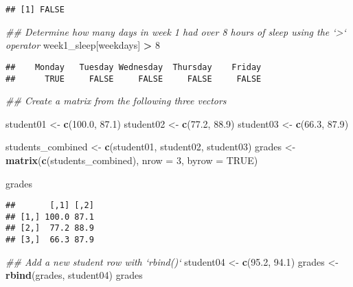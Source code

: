 \documentclass[
]{article}
\newenvironment{Shaded}{\begin{snugshade}}{\end{snugshade}}
\newcommand{\CommentTok}[1]{\textcolor[rgb]{0.56,0.35,0.01}{\textit{#1}}}
\newcommand{\DataTypeTok}[1]{\textcolor[rgb]{0.13,0.29,0.53}{#1}}
\newcommand{\DecValTok}[1]{\textcolor[rgb]{0.00,0.00,0.81}{#1}}
\newcommand{\FloatTok}[1]{\textcolor[rgb]{0.00,0.00,0.81}{#1}}
\newcommand{\KeywordTok}[1]{\textcolor[rgb]{0.13,0.29,0.53}{\textbf{#1}}}
\newcommand{\NormalTok}[1]{#1}
\newcommand{\OperatorTok}[1]{\textcolor[rgb]{0.81,0.36,0.00}{\textbf{#1}}}
\newcommand{\OtherTok}[1]{\textcolor[rgb]{0.56,0.35,0.01}{#1}}
\newcommand{\StringTok}[1]{\textcolor[rgb]{0.31,0.60,0.02}{#1}}
\begin{document}
\begin{verbatim}
## [1] FALSE
\end{verbatim}

\begin{Shaded}
\begin{Highlighting}[]
\CommentTok{## Determine how many days in week 1 had over 8 hours of sleep using the `>` operator}
\NormalTok{week1_sleep[weekdays] }\OperatorTok{>}\StringTok{ }\DecValTok{8}
\end{Highlighting}
\end{Shaded}

\begin{verbatim}
##    Monday   Tuesday Wednesday  Thursday    Friday 
##      TRUE     FALSE     FALSE     FALSE     FALSE
\end{verbatim}

\begin{Shaded}
\begin{Highlighting}[]
\CommentTok{## Create a matrix from the following three vectors}

\NormalTok{student01 <-}\StringTok{ }\KeywordTok{c}\NormalTok{(}\FloatTok{100.0}\NormalTok{, }\FloatTok{87.1}\NormalTok{)}
\NormalTok{student02 <-}\StringTok{ }\KeywordTok{c}\NormalTok{(}\FloatTok{77.2}\NormalTok{, }\FloatTok{88.9}\NormalTok{)}
\NormalTok{student03 <-}\StringTok{ }\KeywordTok{c}\NormalTok{(}\FloatTok{66.3}\NormalTok{, }\FloatTok{87.9}\NormalTok{)}

\NormalTok{students_combined <-}\StringTok{ }\KeywordTok{c}\NormalTok{(student01, student02, student03)}
\NormalTok{grades <-}\StringTok{ }\KeywordTok{matrix}\NormalTok{(}\KeywordTok{c}\NormalTok{(students_combined), }\DataTypeTok{nrow =} \DecValTok{3}\NormalTok{, }\DataTypeTok{byrow =} \OtherTok{TRUE}\NormalTok{)}

\NormalTok{grades}
\end{Highlighting}
\end{Shaded}

\begin{verbatim}
##       [,1] [,2]
## [1,] 100.0 87.1
## [2,]  77.2 88.9
## [3,]  66.3 87.9
\end{verbatim}

\begin{Shaded}
\begin{Highlighting}[]
\CommentTok{## Add a new student row with `rbind()`}
\NormalTok{student04 <-}\StringTok{ }\KeywordTok{c}\NormalTok{(}\FloatTok{95.2}\NormalTok{, }\FloatTok{94.1}\NormalTok{)}
\NormalTok{grades <-}\StringTok{ }\KeywordTok{rbind}\NormalTok{(grades, student04)}
\NormalTok{grades}
\end{Highlighting}
\end{Shaded}
\end{document}
